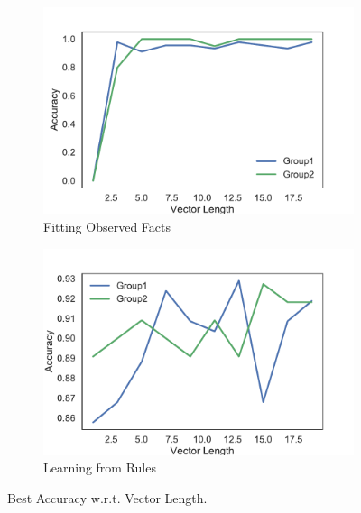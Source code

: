 \begin{figure}[!]
    \centering
    \begin{subfigure}[]{0.5\textwidth}
        \includegraphics[width=\textwidth]{img/curve3.pdf}
        \caption{Fitting Observed Facts}
        \label{fig:sensitive-best-accuracy-1}
    \end{subfigure}

    \begin{subfigure}[]{0.5\textwidth}
        \includegraphics[width=\textwidth]{img/curve4.pdf}
        \caption{Learning from Rules }
        \label{fig:sensitive-best-accuracy-2}
    \end{subfigure}
    \caption{Best Accuracy w.r.t. Vector Length.}
    \label{fig:sensitive}
\end{figure}
